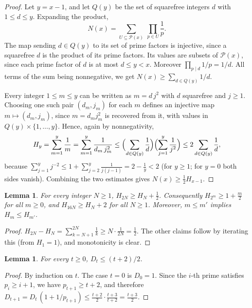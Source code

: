 \documentclass[11pt,a4paper]{amsart}
\newtheorem{lemma}[theorem]{Lemma}
\theoremstyle{definition}
\theoremstyle{remark}
\begin{document}
\begin{proof}
Let $y = x-1$, and let $Q(y)$ be the set of squarefree integers $d$ with $1\le d\le y$. Expanding the product,
\[
  N(x) = \sum_{U\subseteq \mathcal{P}(x)} \ \prod_{p\in U}\frac1p .
\]
The map sending $d\in Q(y)$ to its set of prime factors is injective, since a squarefree $d$ is the product of its prime factors. Its values are subsets of $\mathcal{P}(x)$, since each prime factor of $d$ is at most $d \le y < x$. Moreover $\prod_{p\mid d}1/p = 1/d$. All terms of the sum being nonnegative, we get $N(x) \ge \sum_{d\in Q(y)} 1/d$.

Every integer $1\le m\le y$ can be written as $m = d\,j^2$ with $d$ squarefree and $j\ge1$. Choosing one such pair $(d_m,j_m)$ for each $m$ defines an injective map $m\mapsto(d_m,j_m)$, since $m = d_m j_m^2$ is recovered from it, with values in $Q(y)\times\{1,\dots,y\}$. Hence, again by nonnegativity,
\[
  H_y = \sum_{m=1}^y \frac1m = \sum_{m=1}^{y}\frac{1}{d_m\,j_m^2}
  \le \Bigl(\sum_{d\in Q(y)}\frac1d\Bigr)\Bigl(\sum_{j=1}^y\frac1{j^2}\Bigr)
  \le 2\sum_{d\in Q(y)}\frac1d,
\]
because $\sum_{j=1}^y j^{-2} \le 1+\sum_{j= 2}^{y}\frac{1}{j(j-1)} = 2 - \frac1y < 2$ (for $y\ge1$; for $y=0$ both sides vanish). Combining the two estimates gives $N(x) \ge \frac12 H_{x-1}$.
\end{proof}

\begin{lemma}\label{lem:doubling}
For every integer $N\ge 1$, $H_{2N} \ge H_N + \tfrac12$. Consequently $H_{2^m}\ge 1+\tfrac m2$ for all $m\ge0$, and $H_{16N}\ge H_N+2$ for all $N\ge1$. Moreover, $m\le m'$ implies $H_m\le H_{m'}$.
\end{lemma}

\begin{proof}
$H_{2N}-H_N = \sum_{k=N+1}^{2N}\frac1k \ge N\cdot\frac{1}{2N} = \frac12$. The other claims follow by iterating this (from $H_1 = 1$), and monotonicity is clear.
\end{proof}

\begin{lemma}\label{lem:Dt}
For every $t\ge0$, $D_t \le (t+2)/2$.
\end{lemma}

\begin{proof}
By induction on $t$. The case $t=0$ is $D_0 = 1$. Since the $i$-th prime satisfies $p_i \ge i+1$, we have $p_{t+1}\ge t+2$, and therefore
$D_{t+1} = D_t\,(1+1/p_{t+1}) \le \frac{t+2}{2}\cdot\frac{t+3}{t+2} = \frac{t+3}{2}$.
\end{proof}
\end{document}
